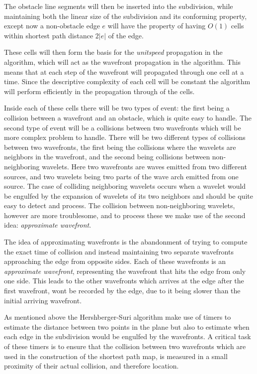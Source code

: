 The obstacle line segments will then be inserted into the subdivision, while
maintaining both the linear size of the subdivision and its conforming property, except 
now a non-obstacle edge $e$ will have the property of having $O(1)$ cells within 
shortest path distance $2|e|$ of the edge.

These cells will then form the basis for the \textit{unitspeed} propagation in the 
algorithm, which will act as the wavefront propagation in the algorithm. This means 
that at each step of the wavefront will propagated through one cell at a time. 
Since the descriptive complexity of each cell will be constant the 
algorithm will perform efficiently in the propagation through of the cells.

Inside each of these cells there will be two types of event: the first being a
collision between a wavefront and an obstacle, which is quite easy to handle. The 
second type of event will be a collisions between two wavefronts which will be more 
complex problem to handle. There will be two different types of collisions between two 
wavefronts, the first being the collisions where the wavelets are neighbors in the 
wavefront, and the second being collisions between non-neighboring wavelets. Here two 
wavefronts are waves emitted from two different sources, and two wavelets being two 
parts of the wave arch emitted from one source. The case of colliding neighboring 
wavelets occurs when a wavelet would be engulfed by the expansion of wavelets of its 
two neighbors and should be quite easy to detect and process. The collision between 
non-neighboring wavelets, however are more troublesome, and to process these we make 
use of the second idea: \emph{approximate wavefront}.

The idea of approximating wavefronts is the abandonment of trying to compute the exact 
time of collision and instead maintaining two separate wavefronts approaching the edge 
from opposite sides. Each of these wavefronts is an \textit{approximate wavefront}, 
representing the wavefront that hits the edge from only one side. This leads to the 
other wavefronts which arrives at the edge after the first wavefront, wont be recorded by 
the edge, due to it being slower than the initial arriving wavefront.

As mentioned above the Hershberger-Suri algorithm make use of timers to estimate the 
distance between two points in the plane but also to estimate when each edge in the 
subdivision would be engulfed by the wavefronts. A critical task of these timers is to 
ensure that the collision between two wavefronts which are used in the construction of 
the shortest path map, is measured in a small proximity of their actual collision, and 
therefore location.


